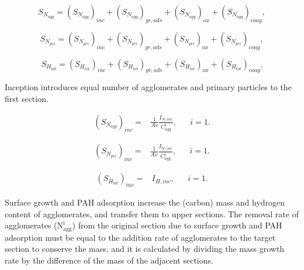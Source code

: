 \begin{equation}
	S_{N_{agg}} = 
	\left(S_{N_{agg}}\right)_{inc}
	+\left(S_{N_{agg}}\right)_{gr, ads}
	+\left(S_{N_{agg}}\right)_{ox}
	+\left(S_{N_{agg}}\right)_{coag}
	\label{eqn:S_Naggsect},
\end{equation}

\begin{equation}
	S_{N_{pri}} = 
	\left(S_{N_{pri}}\right)_{inc}
	+\left(S_{N_{pri}}\right)_{gr, ads}
	+\left(S_{N_{pri}}\right)_{ox}
	+\left(S_{N_{pri}}\right)_{coag}
	\label{eqn:S_Nprisect},
\end{equation}

\begin{equation}
	S_{H_{tot}} = 
	\left(S_{H_{tot}}\right)_{inc}
	+\left(S_{H_{tot}}\right)_{gr, ads}
	+\left(S_{H_{tot}}\right)_{ox}
	+\left(S_{H_{tot}}\right)_{coag}
	\label{eqn:S_Htotsect}.
\end{equation}

Inception introduces equal number of agglomerates and primary particles to the first section.

\begin{equation}
	\begin{aligned}
	\left(S_{N_{agg}}\right)_{inc} =
	&\frac{1}{Av}\frac{I_{N, inc}}{C^i_{agg}}, && i=1.
	\end{aligned}
	\label{eqn:S_Nagg_incsect}
\end{equation}

\begin{equation}
	\begin{aligned}
	\left(S_{N_{pri}}\right)_{inc} =
	&\frac{1}{Av}\frac{I_{N, inc}}{C^i_{agg}}, && i=1.
	\end{aligned}
	\label{eqn:S_Npri_incsect}
\end{equation}

\begin{equation}
	\begin{aligned}
		\left(S_{H_{tot}}\right)_{inc} =
		&I_{H, inc}, && i=1.
	\end{aligned}
	\label{eqn:S_Htot_incsect}
\end{equation}

Surface growth and PAH adsorption increase the (carbon) mass and hydrogen content of agglomerates, and transfer them to upper sections. The removal rate of agglomerates ($\mathrm{N^i_{agg}}$) from the original section due to surface growth and PAH adsorption must be equal to the addition rate of agglomerates to the target section to conserve the mass, and it is calculated by dividing the mass growth rate by the difference of the mass of the adjacent sections.

